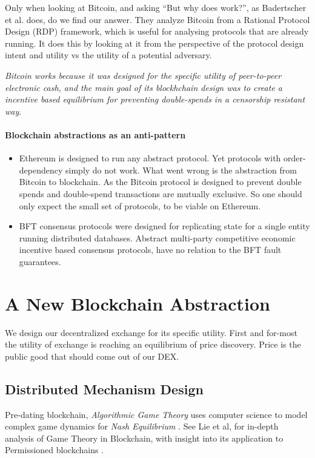 \documentclass[12pt]{article}
\begin{document}
Only when looking at Bitcoin, and asking ``But why does work?'', as Badertscher et al. \cite{badertscher2018but} does, do we find our answer. They analyze Bitcoin from a Rational Protocol Design (RDP) framework, which is useful for analysing protocols that are already running. It does this by looking at it from the perspective of the protocol design intent and utility vs the utility of a potential adversary.  

\textit{Bitcoin works because it was designed for the specific utility of peer-to-peer electronic cash, and the main goal of its blockhchain design was to create a incentive based equilibrium for preventing double-spends in a censorship resistant way}. \cite{Nakamoto}

\paragraph{Blockchain abstractions as an anti-pattern}
\begin{itemize}{}
\item Ethereum is designed to run any abstract protocol. Yet protocols with order-dependency simply do not work. What went wrong is the abstraction from Bitcoin to blockchain. As the Bitcoin protocol is designed to prevent double spends and double-spend transactions are mutually exclusive. So one should only expect the small set of protocols, to be viable on Ethereum.    

\item BFT consensus protocols were designed for replicating state for a single entity running distributed databases. Abstract multi-party competitive economic incentive based consensus protocols, have no relation to the BFT fault guarantees. 

\end{itemize}

\section*{A New Blockchain Abstraction}
We design our decentralized exchange for its specific utility. First and for-most the utility of exchange is reaching an equilibrium of price discovery. Price is the public good that should come out of our DEX. 

\subsection*{Distributed Mechanism Design}
Pre-dating blockchain, \emph{Algorithmic Game Theory} uses computer science to model complex game  dynamics for \emph{Nash Equilibrium} \cite{nisan_roughgarden_tardos_vazirani_2007}. See Lie et al, for in-depth analysis of Game Theory in Blockchain, with insight into its application to Permissioned blockchains \cite{Liu}.  
\end{document}
